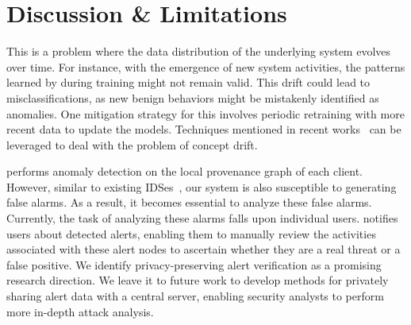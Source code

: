 \section{Discussion \& Limitations}
\label{sec:discussion}




 This is a problem where the data distribution of the underlying system evolves over time. For instance, with the emergence of new system activities, the patterns learned by \Sys during training might not remain valid. This drift could lead to misclassifications, as new benign behaviors might be mistakenly identified as anomalies. One mitigation strategy for this involves periodic retraining with more recent data to update the models. Techniques mentioned in recent works~\cite{lu2018learning, barbero2022transcending,jordaney2017transcend} can be leveraged to deal with the problem of concept drift. %

 \Sys performs anomaly detection on the local provenance graph of each client. However, similar to existing IDSes~\cite{flash2024,cheng2023kairos,wang2022threatrace}, our system is also susceptible to generating false alarms. As a result, it becomes essential to analyze these false alarms. Currently, the task of analyzing these alarms falls upon individual users. \Sys notifies users about detected alerts, enabling them to manually review the activities associated with these alert nodes to ascertain whether they are a real threat or a false positive. We identify privacy-preserving alert verification as a promising research direction. We leave it to future work to develop methods for privately sharing alert data with a central server, enabling security analysts to perform more in-depth attack analysis.



